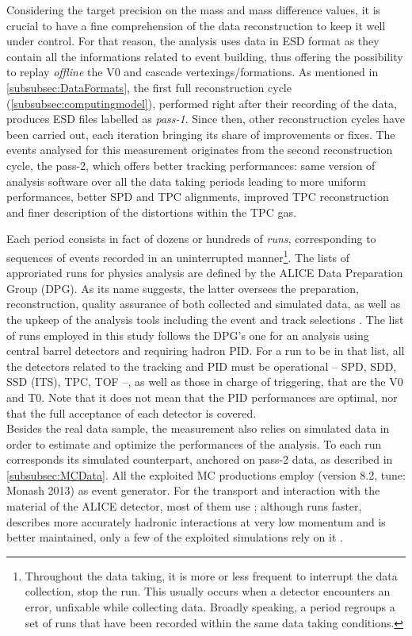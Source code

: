 Considering the target precision on the mass and mass difference values, it is crucial to have a fine comprehension of the data reconstruction to keep it well under control. For that reason, the analysis uses data in ESD format as they contain all the informations related to event building, thus offering the possibility to replay \textit{offline} the V0 and cascade vertexings/formations. As mentioned in \Sec\ref{subsubsec:DataFormats}, the first full reconstruction cycle (\Sec\ref{subsubsec:computingmodel}), performed right after their recording of the data, produces ESD files labelled as \textit{pass-1}. Since then, other reconstruction cycles have been carried out, each iteration bringing its share of improvements or fixes. The events analysed for this measurement originates from the second reconstruction cycle, the pass-2, which offers better tracking performances: same version of analysis software over all the data taking periods leading to more uniform performances, better SPD and TPC alignments, improved TPC reconstruction and finer description of the distortions within the TPC gas.

Each period consists in fact of dozens or hundreds of \textit{runs}, corresponding to sequences of events recorded in an uninterrupted manner\footnote{Throughout the data taking, it is more or less frequent to interrupt the data collection, \ie stop the run. This usually occurs when a detector encounters an error, unfixable while collecting data. Broadly speaking, a period regroups a set of runs that have been recorded within the same data taking conditions.}. The lists of approriated runs for physics analysis are defined by the ALICE Data Preparation Group (DPG). As its name suggests, the latter oversees the preparation, reconstruction, quality assurance of both collected and simulated data, as well as the upkeep of the analysis tools including the event and track selections \cite{alicecollaborationALICEDataPreparation2023}. The list of runs employed in this study follows the DPG's one for an analysis using central barrel detectors and requiring hadron PID. For a run to be in that list, all the detectors related to the tracking and PID must be operational -- \ie SPD, SDD, SSD (ITS), TPC, TOF --, as well as those in charge of triggering, that are the V0 and T0. Note that it does not mean that the PID performances are optimal, nor that the full acceptance of each detector is covered.\\

Besides the real data sample, the measurement also relies on simulated data in order to estimate and optimize the performances of the analysis. To each run corresponds its simulated counterpart, anchored on pass-2 data, as described in \Sec\ref{subsubsec:MCData}. All the exploited MC productions employ \Pythiaeight (version 8.2, tune: Monash 2013) as event generator. For the transport and interaction with the material of the ALICE detector, most of them use \GeantThree; although \GeantFour runs faster, describes more accurately hadronic interactions at very low momentum and is better maintained, only a few of the exploited simulations rely on it \cite{barendsGeant4ValidationStudy2017}.

